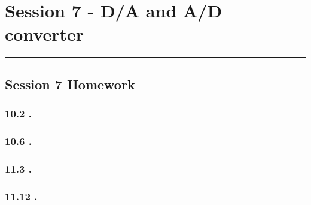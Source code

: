 \section{Session 7 - D/A and A/D converter}
\vspace{-15pt}\noindent\rule{\textwidth}{0.1pt}\vspace{-10pt}
    \subsection*{Session 7 Homework}
    \subsubsection{10.2 \textnormal{}.}
    {\color{hwSolution}

    }

    \subsubsection{10.6 \textnormal{}.}
    {\color{hwSolution}

    }

    \subsubsection{11.3 \textnormal{}.}
    {\color{hwSolution}

    }

    \subsubsection{11.12 \textnormal{}.}
    {\color{hwSolution}

    }